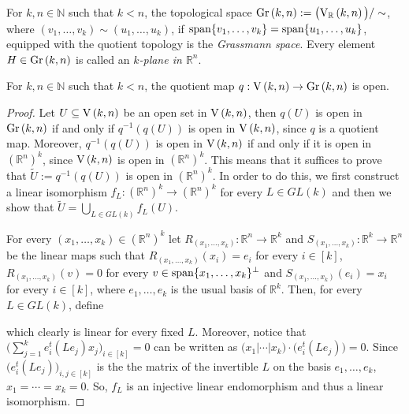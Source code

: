 \begin{definition} For $k,n\in\mathbb{N}$ such that $k<n$, the topological space $\Gr{k}{n}:=\big(\St{k}{n}{\mathbb{R}}\big)/\sim$, where $(v_1,\ldots,v_k)\sim(u_1,\ldots,u_k)$, if $\mathrm{span}\{v_1,\ldots,v_k\}=\mathrm{span}\{u_1,\ldots,u_k\}$, equipped with the quotient topology is the \emph{Grassmann space}. Every element $H\in\Gr{k}{n}$ is called an \emph{$k$-plane in $\mathbb{R}^n$}.
\end{definition}

\begin{lemma}\label{lem:q_open} For $k,n\in\mathbb{N}$ such that $k<n$, the quotient map $q:\St{k}{n}\to\Gr{k}{n}$ is open.
\end{lemma}
\begin{proof} Let $U\subseteq\St{k}{n}$ be an open set in $\St{k}{n}$, then $q(U)$ is open in $\Gr{k}{n}$ if and only if $q^{-1}(q(U))$ is open in $\St{k}{n}$, since $q$ is a quotient map. Moreover, $q^{-1}(q(U))$ is open in $\St{k}{n}$ if and only if it is open in $(\mathbb{R}^{n})^k$, since $\St{k}{n}$ is open in $(\mathbb{R}^{n})^k$. This means that it suffices to prove that $\tilde{U}:=q^{-1}(q(U))$ is open in $(\mathbb{R}^{n})^k$. In order to do this, we first construct a linear isomorphism $f_L:(\mathbb{R}^n)^k\to(\mathbb{R}^n)^k$ for every $L\in GL(k)$ and then we show that
$\tilde{U}=\bigcup_{L\in GL(k)}f_L(U)$.

For every $(x_1,\ldots,x_k)\in(\mathbb{R}^n)^k$ let $R_{(x_1,\ldots,x_k)}:\mathbb{R}^n\to\mathbb{R}^k$ and $S_{(x_1,\ldots,x_k)}:\mathbb{R}^k\to\mathbb{R}^n$ be the linear maps such that $R_{(x_1,\ldots,x_k)}(x_i)=e_i$ for every $i\in[k]$, $R_{(x_1,\ldots,x_k)}(v)=0$ for every $v\in\mathrm{span}\{x_1,\ldots,x_k\}^{\perp}$ and $S_{(x_1,\ldots,x_k)}(e_i)=x_i$ for every $i\in[k]$, where $e_1,\ldots,e_k$ is the usual basis of $\mathbb{R}^k$. Then, for every $L\in GL(k)$, define
\begin{center}
\end{center}
which clearly is linear for every fixed $L$. Moreover, notice that $\big(\sum_{j=1}^ke_i^t(Le_j)x_j\big)_{i\in[k]}=0$ can be written as $\big(x_1|\cdots|x_k\big)\cdot\big(e_i^t(Le_j)\big)=0$. Since $\big(e_i^t(Le_j)\big)_{i,j\in[k]}$ is the the matrix of the invertible $L$ on the basis $e_1,\ldots,e_k$, $x_1=\cdots=x_k=0$. So, $f_L$ is an injective linear endomorphism and thus a linear isomorphism.


\end{proof}
